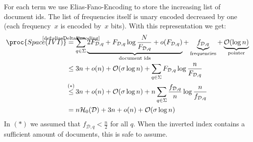 \begin{Proof}
  For each term we use Elias-Fano-Encoding to store the increasing list of document ids. The list of frequencies itself is unary encoded decreased by one (each frequency~$x$ is encoded by~$x$ bits). With this representation we get:
  \begin{align}
    \begin{aligned}
      \proc{Space(IVI)}
      &\stackrel{\mathclap{\text{\ref{def:eliasDeltaEncoding}}}}{=}
      \sum\limits_{q \in \Sigma}
      \underbrace{2F_{\mathcal{D},q} + F_{\mathcal{D},q} \log\frac{N}{F_{\mathcal{D}, q}} + o(F_{\mathcal{D},q})}_{\text{document ids}} +
      \underbrace{f_{\mathcal{D},q}}_{\text{frequencies}} +
      \underbrace{\mathcal{O}(\log n)}_{\text{pointer}} \\
      &\leq 3n + o(n) + \mathcal{O}(\sigma \log n) + \sum\limits_{q \in \Sigma} F_{\mathcal{D},q}\log\frac{n}{F_{\mathcal{D},q}} \\
      &\stackrel{\mathclap{(*)}}{\leq}
      3n + o(n) + \mathcal{O}(\sigma \log n) +
      n\sum\limits_{q \in \Sigma}\frac{f_{\mathcal{D},q}}{n}\log\frac{n}{f_{\mathcal{D},q}} \\
      &= n\mathcal{H}_0(\mathcal{D}) + 3n + o(n) + \mathcal{O}(\sigma \log n)
    \end{aligned}
  \end{align}
  In $(*)$ we assumed that $f_{\mathcal{D},q} < \frac{n}{2}$ for all $q$. When the inverted index contains a sufficient amount of documents, this is safe to assume.
\end{Proof}
